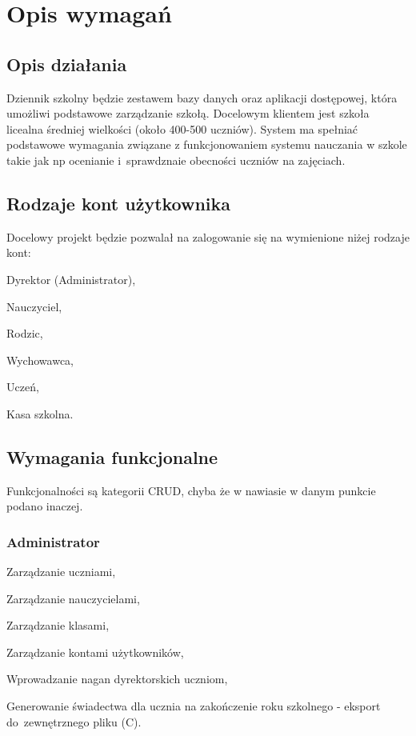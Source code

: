 \documentclass[12pt]{article}
\begin{document}
\section{Opis wymagań}
\subsection{Opis działania}
\hspace{0.5cm} Dziennik szkolny będzie zestawem bazy danych oraz aplikacji dostępowej, która umożliwi podstawowe zarządzanie szkołą. Docelowym klientem jest szkoła licealna średniej wielkości (około 400-500 uczniów). System ma spełniać podstawowe wymagania związane z funkcjonowaniem systemu nauczania w szkole takie jak np ocenianie i~sprawdznaie obecności uczniów na zajęciach.
\subsection{Rodzaje kont użytkownika}

\hspace{0.5cm} Docelowy projekt będzie pozwalał na zalogowanie się na wymienione niżej rodzaje kont:
\begin{itemize*}
    \item Dyrektor (Administrator),
    \item Nauczyciel,
    \item Rodzic,
    \item Wychowawca,
    \item Uczeń,
    \item Kasa szkolna.
\end{itemize*}
\subsection{Wymagania funkcjonalne}

\hspace{0.5cm} Funkcjonalności są kategorii CRUD, chyba że w nawiasie w danym punkcie podano inaczej.

\subsubsection{Administrator}
\begin{itemize*}
    \item Zarządzanie uczniami,
    \item Zarządzanie nauczycielami,
    \item Zarządzanie klasami,
    \item Zarządzanie kontami użytkowników,
    \item Wprowadzanie nagan dyrektorskich uczniom,
    \item Generowanie świadectwa dla ucznia na zakończenie roku szkolnego - eksport do~zewnętrznego pliku (C).
\end{itemize*}
\end{document}
